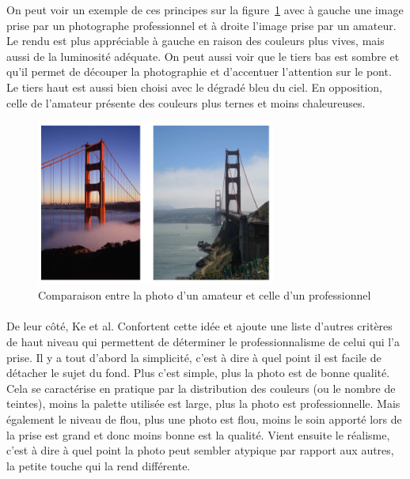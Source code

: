 \documentclass[11pt, french]{report-rd-info}
\begin{document}
On peut voir un exemple de ces principes sur la figure~\ref{fig:ComparaisonPhotosAmateurPro} avec à gauche une image prise par un photographe professionnel et à droite l’image prise par un amateur. Le rendu est plus appréciable à gauche en raison des couleurs plus vives, mais aussi de la luminosité adéquate. On peut aussi voir que le tiers bas est sombre et qu’il permet de découper la photographie et d’accentuer l’attention sur le pont. Le tiers haut est aussi bien choisi avec le dégradé bleu du ciel. En opposition, celle de l’amateur présente des couleurs plus ternes et moins chaleureuses.

\begin{figure}
	\centering
\includegraphics[width=0.7\textwidth]{Images/ea_comparaison_photo_amateur_professionnel}
	\caption{Comparaison entre la photo d'un amateur et celle d'un professionnel\cite{Ke}}
	\label{fig:ComparaisonPhotosAmateurPro}
\end{figure}


\paragraph*{}
De leur côté, Ke et al. Confortent cette idée et ajoute une liste d’autres critères de haut niveau qui permettent de déterminer le professionnalisme de celui qui l’a prise. Il y a tout d’abord la simplicité, c'est à dire à quel point il est facile de détacher le sujet du fond. Plus c'est simple, plus la photo est de bonne qualité. Cela se caractérise en pratique par la distribution des couleurs (ou le nombre de teintes), moins la palette utilisée est large, plus la photo est professionnelle. Mais également le niveau de flou, plus une photo est flou, moins le soin apporté lors de la prise est grand et donc moins bonne est la qualité.
Vient ensuite le réalisme, c'est à dire à quel point la photo peut sembler atypique par rapport aux autres, la petite touche qui la rend différente.
\end{document}
